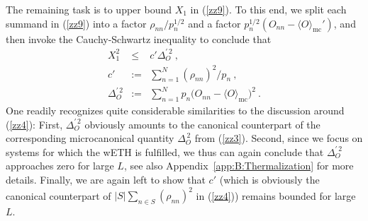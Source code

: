 \documentclass[twocolumn,aps,prb,floatfix,superscriptaddress]{revtex4-2}
\newcommand{\<}{\left\langle}	%
\renewcommand{\>}{\right\rangle}	%
\newcommand{\Omc}{\langle O\rangle_{\!\mathrm{mc}}}
\begin{document}
The remaining task is to upper bound $X_1$ in (\ref{zz9}).
To this end, we split each summand in (\ref{zz9}) into a factor
$\rho_{nn}/p_n^{1/2}$ and a factor $p_n^{1/2} (O_{nn}-\Omc')$, 
and then invoke the Cauchy-Schwartz inequality to conclude that
\begin{eqnarray}
X_1^2 & \leq & c' \Delta_O^{\prime \, 2}
\ ,
\label{zz14}
\\
c' &:= & \sum_{n=1}^N (\rho_{nn})^2/p_n
\label{zz14a}
\ ,
\label{zz15}
\\
\Delta_O^{\prime \,2}  &:= & \sum_{n=1}^N p_n \big( O_{nn} - \Omc \big)^{\! 2} \ .
\label{zz16}
\end{eqnarray}
One readily recognizes quite considerable similarities to the 
discussion around (\ref{zz4}):
First, $\Delta_O^{\prime\,2}$ obviously amounts to the canonical counterpart
of the corresponding microcanonical quantity 
$\Delta_O^{\,2}$ from (\ref{zz3}).
Second, since we focus on systems for which the wETH is 
fulfilled, we thus can again conclude that $\Delta_O^{\prime\,2}$
approaches zero for large $L$,
see also Appendix~\ref{app:B:Thermalization}
for more details.
Finally, we are again left to show that $c'$ 
(which is obviously the canonical counterpart of
$|S| \sum_{n\in S} (\rho_{nn})^2$ in (\ref{zz4}))
remains bounded for large $L$.
\end{document}
